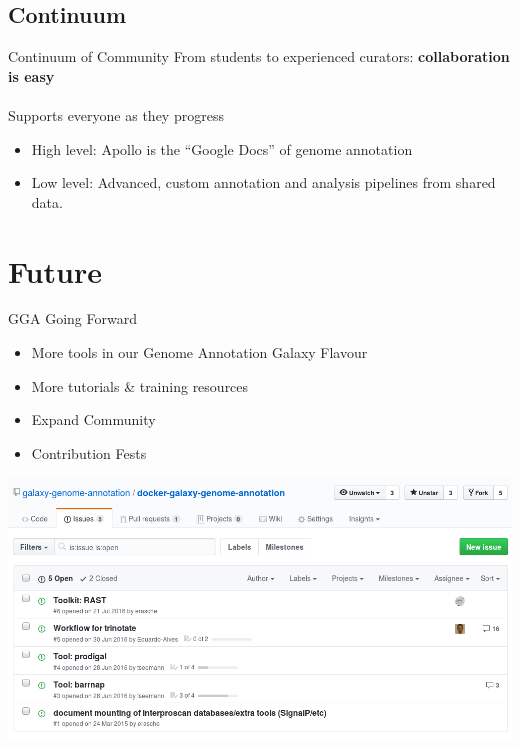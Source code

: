 \documentclass[12pt]{phage3slides} %
\begin{document}
\subsection{Continuum}
\begin{frame}{Continuum of Community}
    From students to experienced curators: \textbf{collaboration is easy}
    \ \\\ \\
    Supports everyone as they progress

    \begin{itemize}
        \item High level: Apollo is the ``Google Docs'' of genome annotation
        \item Low level: Advanced, custom annotation and analysis pipelines from shared data.
    \end{itemize}
\end{frame}

\section{Future}
\begin{frame}{GGA Going Forward}
    \begin{itemize}
        \item More tools in our Genome Annotation Galaxy Flavour
        \item More tutorials \& training resources
        \item Expand Community
        \item Contribution Fests
    \end{itemize}
    \includegraphics[width=\textwidth]{img/issues}
\end{frame}
\end{document}
